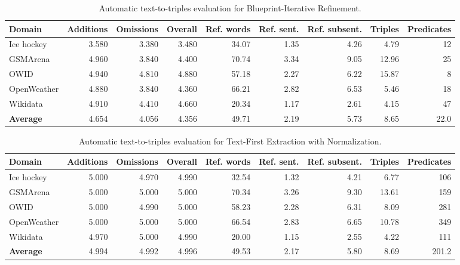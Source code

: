 \newcommand{\tripleheader}{\textbf{Domain} & \textbf{Additions} & \textbf{Omissions} & \textbf{Overall} & \textbf{Ref. words} & \textbf{Ref. sent.} & \textbf{Ref. subsent.} & \textbf{Triples} & \textbf{Predicates} \\}
\begin{table}[!htbp]
\centering
\caption{Automatic text-to-triples evaluation for Blueprint-Iterative Refinement.}
\label{tab:pipeline-blueprint-triples-results}
\begin{tabular}{lrrrrrrrr}
\hline
\tripleheader
\hline
Ice hockey & 3.580 & 3.380 & 3.480 & 34.07 & 1.35 & 4.26 & 4.79 & 12 \\
GSMArena & 4.960 & 3.840 & 4.400 & 70.74 & 3.34 & 9.05 & 12.96 & 25 \\
OWID & 4.940 & 4.810 & 4.880 & 57.18 & 2.27 & 6.22 & 15.87 & 8 \\
OpenWeather & 4.880 & 3.840 & 4.360 & 66.21 & 2.82 & 6.53 & 5.46 & 18 \\
Wikidata & 4.910 & 4.410 & 4.660 & 20.34 & 1.17 & 2.61 & 4.15 & 47 \\
\hline
\textbf{Average} & 4.654 & 4.056 & 4.356 & 49.71 & 2.19 & 5.73 & 8.65 & 22.0 \\
\hline
\end{tabular}
\end{table}

\begin{table}[!htbp]
\centering
\caption{Automatic text-to-triples evaluation for Text-First Extraction with Normalization.}
\label{tab:pipeline-text-first-triples-results}
\begin{tabular}{lrrrrrrrr}
\hline
\tripleheader
\hline
Ice hockey & 5.000 & 4.970 & 4.990 & 32.54 & 1.32 & 4.21 & 6.77 & 106 \\
GSMArena & 5.000 & 5.000 & 5.000 & 70.34 & 3.26 & 9.30 & 13.61 & 159 \\
OWID & 5.000 & 4.990 & 5.000 & 58.23 & 2.28 & 6.31 & 8.09 & 281 \\
OpenWeather & 5.000 & 5.000 & 5.000 & 66.54 & 2.83 & 6.65 & 10.78 & 349 \\
Wikidata & 4.970 & 5.000 & 4.990 & 20.00 & 1.15 & 2.55 & 4.22 & 111 \\
\hline
\textbf{Average} & 4.994 & 4.992 & 4.996 & 49.53 & 2.17 & 5.80 & 8.69 & 201.2 \\
\hline
\end{tabular}
\end{table}

